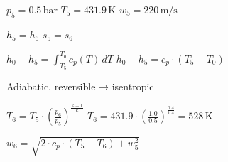 \( p_5 = 0.5 \, \text{bar} \)  
\( T_5 = 431.9 \, \text{K} \)  
\( w_5 = 220 \, \text{m/s} \)  

\( h_5 = h_6 \)  
\( s_5 = s_6 \)  

\( h_0 - h_5 = \int_{T_5}^{T_0} c_p(T) \, dT \)  
\( h_0 - h_5 = c_p \cdot (T_5 - T_0) \)  

Adiabatic, reversible → isentropic  

\( T_6 = T_5 \cdot \left( \frac{p_6}{p_5} \right)^{\frac{\kappa - 1}{\kappa}} \)  
\( T_6 = 431.9 \cdot \left( \frac{1.0}{0.5} \right)^{\frac{0.4}{1.4}} = 528 \, \text{K} \)  

\( w_6 = \sqrt{2 \cdot c_p \cdot (T_5 - T_6) + w_5^2} \)